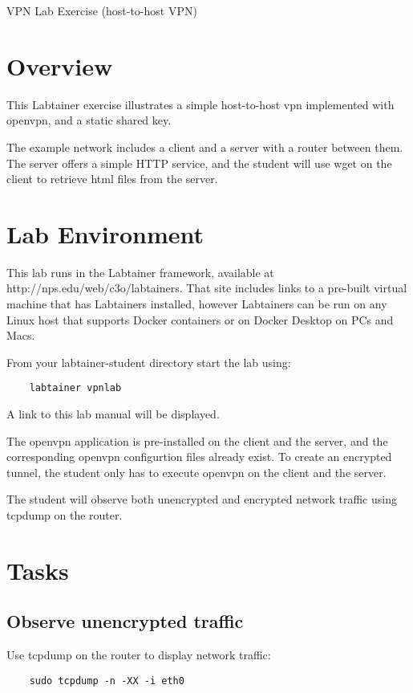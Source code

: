 


\begin{center}
{\LARGE VPN Lab Exercise (host-to-host VPN)}
\vspace{0.1in}\\
\end{center}

\section{Overview}
This Labtainer exercise illustrates a simple
host-to-host vpn implemented with openvpn, and
a static shared key.

The example network includes a client and a 
server with a router between them.  The server
offers a simple HTTP service,  and the student
will use wget on the client to retrieve html
files from the server.

\section{Lab Environment}
This lab runs in the Labtainer framework,
available at http://nps.edu/web/c3o/labtainers.
That site includes links to a pre-built virtual machine
that has Labtainers installed, however Labtainers can
be run on any Linux host that supports Docker containers
or on Docker Desktop on PCs and Macs.

From your labtainer-student directory start the lab using:
\begin{verbatim}
    labtainer vpnlab
\end{verbatim}
A link to this lab manual will be displayed.

The openvpn application is pre-installed
on the client and the server, and the
corresponding openvpn configurtion files
already exist.  To create an encrypted tunnel,
the student only has to execute openvpn on
the client and the server.

The student will observe both unencrypted 
and encrypted network traffic using
tcpdump on the router.

\section{Tasks}

\subsection{Observe unencrypted traffic}
Use tcpdump on the router to display network traffic:
\begin{verbatim}
    sudo tcpdump -n -XX -i eth0
\end{verbatim}

